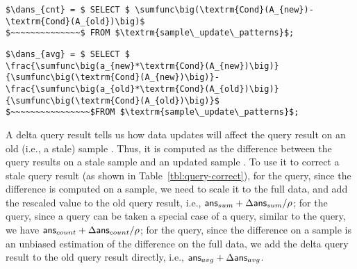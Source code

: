 \begin{lstlisting}[mathescape,basicstyle={\scriptsize}]
$\dans_{cnt} = $ SELECT $ \sumfunc\big(\textrm{Cond}(A_{new})-\textrm{Cond}(A_{old})\big)$ 
$~~~~~~~~~~~~~~$ FROM $\textrm{sample\_update\_patterns}$;
\end{lstlisting}


\begin{lstlisting}[mathescape,basicstyle={\scriptsize}]
$\dans_{avg} = $ SELECT $
\frac{\sumfunc\big(a_{new}*\textrm{Cond}(A_{new})\big)}{\sumfunc\big(\textrm{Cond}(A_{new})\big)}- \frac{\sumfunc\big(a_{old}*\textrm{Cond}(A_{old})\big)}{\sumfunc\big(\textrm{Cond}(A_{old})\big)}$ 
$~~~~~~~~~~~~~~~~$FROM $\textrm{sample\_update\_patterns}$;
\end{lstlisting}

A delta query result tells us how data updates will affect the query result on an old (i.e., a stale) sample \aggview. Thus, it is computed as the difference between the query results on a stale sample \aggview and an updated sample \aggview. To use it to correct a stale query result (as shown in Table~\ref{tbl:query-correct}), for the \sumfunc query, since the \sumfunc difference is computed on a sample, we need to scale it to the full data, and add the rescaled value to the old query result, i.e., $\textsf{ans}_{sum}+\Delta\textsf{ans}_{sum}/\rho $; for the \countfunc query, since a \countfunc query can be taken a special case of a \sumfunc query, similar to the \sumfunc query, we have $\textsf{ans}_{count}+\Delta\textsf{ans}_{count}/\rho $; for the \avgfunc query, since the \avgfunc difference on a sample is an unbiased estimation of the \avgfunc difference on the full data, we add the delta query result to the old query result directly, i.e., $\textsf{ans}_{avg}+\Delta\textsf{ans}_{avg}$.


